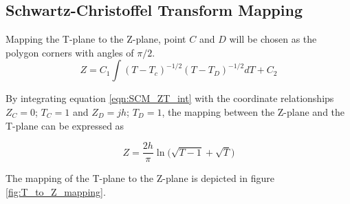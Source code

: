 \subsection*{Schwartz-Christoffel Transform Mapping}

  \par Mapping the T-plane to the Z-plane, point $C$ and $D$ will be chosen as the polygon corners with angles of $\pi/2$.  
   \begin{equation}
      Z = C_1\int (T-T_c)^{-1/2}(T-T_D)^{-1/2}dT + C_2
      \label{eqn:SCM_ZT_int}
  \end{equation}
  
 \noindent By integrating equation \ref{eqn:SCM_ZT_int} with the coordinate relationships $Z_C = 0$; $T_C = 1$ and $Z_D = jh$; $T_D = 1$, the mapping between the Z-plane and the T-plane can be expressed as
  
   \begin{equation}
     Z = \frac{2h}{\pi}\ln\Big(\sqrt{T-1} + \sqrt{T}\Big)
     \label{eqn:TZ}
 \end{equation}
 
 \noindent The mapping of the T-plane to the Z-plane is depicted in figure \ref{fig:T_to_Z_mapping}. 
 
